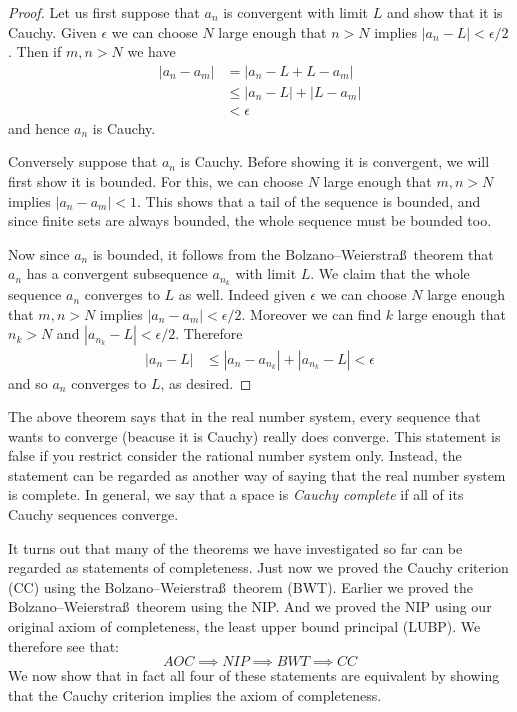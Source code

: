 \documentclass[11pt,oneside]{amsbook}
\theoremstyle{definition}
\theoremstyle{plain}
\theoremstyle{definition}
\theoremstyle{remark}
\numberwithin{equation}{section}
\numberwithin{figure}{section}
\begin{document}
\begin{proof}
  Let us first suppose that $a_n$ is convergent with limit $L$ and show that it is Cauchy. Given $\epsilon$ we can choose $N$ large enough that $n>N$ implies $|a_n-L|<\epsilon/2$. Then if $m,n>N$ we have
  \begin{align*}
    |a_n-a_m|&= |a_n-L+L-a_m|\\
             &\leq |a_n-L|+|L-a_m|\\
             &<\epsilon
  \end{align*}
  and hence $a_n$ is Cauchy.
  
  Conversely suppose that $a_n$ is Cauchy. Before showing it is convergent, we will first show it is bounded. For this, we can choose $N$ large enough that $m,n>N$ implies $|a_n-a_m|<1$. This shows that a tail of the sequence is bounded, and since finite sets are always bounded, the whole sequence must be bounded too.

  Now since $a_n$ is bounded, it follows from the Bolzano--Weierstra\ss\ theorem that $a_n$ has a convergent subsequence $a_{n_k}$ with limit $L$. We claim that the whole sequence $a_n$ converges to $L$ as well. Indeed given $\epsilon$ we can choose $N$ large enough that $m,n>N$ implies $|a_n-a_m|<\epsilon/2$. Moreover we can find $k$ large enough that $n_k>N$ and $|a_{n_k}-L|<\epsilon/2$. Therefore
  \begin{align*}
    |a_n-L|&\leq|a_n-a_{n_k}|+|a_{n_k}-L|<\epsilon
  \end{align*}
  and so $a_n$ converges to $L$, as desired.
\end{proof}

The above theorem says that in the real number system, every sequence that wants to converge (beacuse it is Cauchy) really does converge. This statement is false if you restrict consider the rational number system only. Instead, the statement can be regarded as another way of saying that the real number system is complete. In general, we say that a space is \emph{Cauchy complete} if all of its Cauchy sequences converge.

It turns out that many of the theorems we have investigated so far can be regarded as statements of completeness. Just now we proved the Cauchy criterion (CC) using the Bolzano--Weierstra\ss\ theorem (BWT). Earlier we proved the Bolzano--Weierstra\ss\ theorem using the NIP. And we proved the NIP using our original axiom of completeness, the least upper bound principal (LUBP). We therefore see that:
\[AOC\implies NIP\implies BWT\implies CC
\]
We now show that in fact all four of these statements are equivalent by showing that the Cauchy criterion implies the axiom of completeness.
\end{document}
